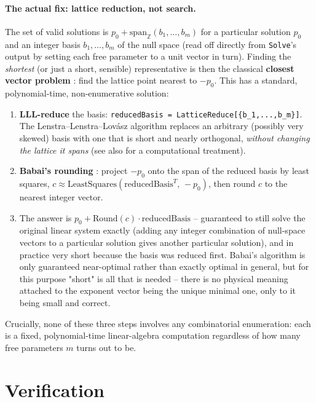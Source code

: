 \documentclass[11pt]{article}
\newcommand{\code}[1]{\texttt{#1}}
\begin{document}
\paragraph{The actual fix: lattice reduction, not search.} The set of valid solutions is $p_0 + \mathrm{span}_{\mathbb Z}(b_1,\dots,b_m)$ for a particular solution $p_0$ and an integer basis $b_1,\dots,b_m$ of the null space (read off directly from \code{Solve}'s output by setting each free parameter to a unit vector in turn). Finding the \emph{shortest} (or just a short, sensible) representative is then the classical \textbf{closest vector problem} \cite{MicciancioGoldwasser2002}: find the lattice point nearest to $-p_0$. This has a standard, polynomial-time, non-enumerative solution:
\begin{enumerate}
	\item \textbf{LLL-reduce} the basis: \code{reducedBasis = LatticeReduce[\{b\_1,...,b\_m\}]}. The Lenstra--Lenstra--Lov\'asz algorithm \cite{LLL1982} replaces an arbitrary (possibly very skewed) basis with one that is short and nearly orthogonal, \emph{without changing the lattice it spans} (see also \cite{Cohen1993} for a computational treatment).
	\item \textbf{Babai's rounding} \cite{Babai1986}: project $-p_0$ onto the span of the reduced basis by least squares, $c \approx \mathrm{LeastSquares}\!\left(\mathrm{reducedBasis}^{T},\,-p_0\right)$, then round $c$ to the nearest integer vector.
	\item The answer is $p_0 + \mathrm{Round}(c)\cdot \mathrm{reducedBasis}$ -- guaranteed to still solve the original linear system exactly (adding any integer combination of null-space vectors to a particular solution gives another particular solution), and in practice very short because the basis was reduced first. Babai's algorithm is only guaranteed near-optimal rather than exactly optimal in general, but for this purpose "short" is all that is needed -- there is no physical meaning attached to the exponent vector being the unique minimal one, only to it being small and correct.
\end{enumerate}
Crucially, none of these three steps involves any combinatorial enumeration: each is a fixed, polynomial-time linear-algebra computation regardless of how many free parameters $m$ turns out to be.

\section{Verification}
\end{document}
